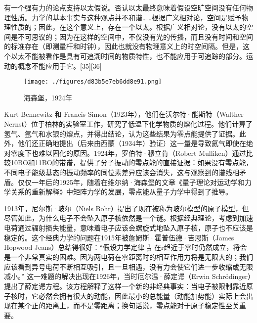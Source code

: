 有一个强有力的论点支持以太假说。否认以太最终意味着假设空旷空间没有任何物理性质。力学的基本事实与这种观点并不和谐……根据广义相对论，空间是赋予物理性质的；因此，在这个意义上，存在一个以太。根据广义相对论，没有以太的空间是不可思议的；因为在这样的空间中，不仅没有光的传播，而且没有时间和空间的标准存在（即测量杆和时钟），因此也就没有物理意义上的时空间隔。但是，这个以太不能被看作是具有可追溯时间的物质特性，也不能应用于可追踪的部分。运动的概念不能应用于它。[35][36]
\begin{figure}[ht]
\centering
\texttt{[image: ./figures/d83b5e7eb6dd8e91.png]}
\caption{海森堡，1924年} \label{fig_LD_7}
\end{figure}
Kurt Bennewitz 和 Francis Simon（1923年），他们在沃尔特·能斯特（Walther Nernst）位于柏林的实验室工作，研究了低温下化学物质的熔化过程。他们计算了氢气、氩气和水银的熔点，并得出结论，认为这些结果为零点能提供了证据。此外，他们还正确地提出（后来由西蒙（1934年）验证）这一量是导致氦气即使在绝对零度下也难以固化的原因。1924年，罗伯特·穆立肯（Robert Mulliken）通过比较10BO和11BO的带谱，提供了分子振动的零点能的直接证据：如果没有零点能，不同电子能级基态的振动频率的同位素差异应该会消失，这与观察到的谱线相矛盾。仅仅一年后的1925年，随着在维尔纳·海森堡的文章《量子理论对运动学和力学关系的重新解释》中矩阵力学的发展，零点能从量子力学中得到了推导。

1913年，尼尔斯·玻尔（Niels Bohr）提出了现在被称为玻尔模型的原子模型，但尽管如此，为什么电子不会坠入原子核依然是一个谜。根据经典理论，考虑到加速电荷通过辐射损失能量，意味着电子应该会螺旋式地坠入原子核，原子也不应该是稳定的。这个经典力学的问题在1915年被詹姆斯·霍普伍德·吉恩斯（James Hopwood Jeans）总结得很好：“假设力学定律 \(\frac{1}{r^2}\) 在r趋近于零时仍然成立，将会是一个非常真实的困难。因为两电荷在零距离时的相互作用力将是无限大的；我们应该看到异号电荷不断相互吸引，且一旦相遇，没有力会使它们进一步收缩或无限减小。” 这一难题的解决出现在1926年，当时厄尔温·薛定谔（Erwin Schrödinger）提出了薛定谔方程。该方程解释了这样一个新的非经典事实：当电子被限制靠近原子核时，它必然会拥有很大的动能，因此最小的总能量（动能加势能）实际上会出现在某个正的距离上，而不是零距离；换句话说，零点能对于原子稳定性至关重要。
